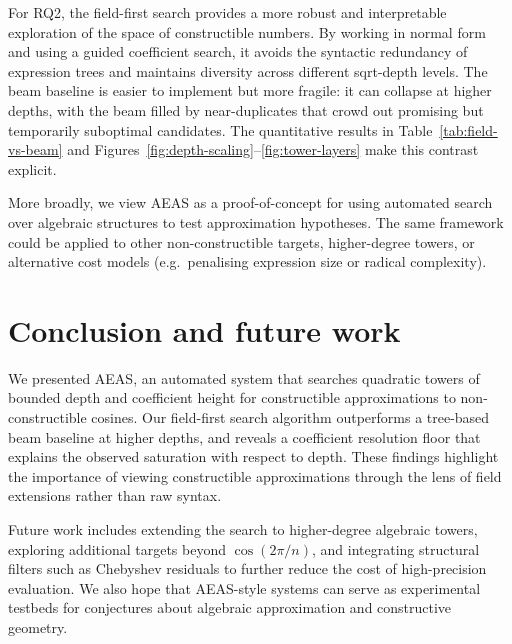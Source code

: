 \documentclass[11pt]{article}
\begin{document}
For RQ2, the field-first search provides a more robust and interpretable exploration of the space of constructible numbers.
By working in normal form and using a guided coefficient search, it avoids the syntactic redundancy of expression trees and maintains diversity across different sqrt-depth levels.
The beam baseline is easier to implement but more fragile: it can collapse at higher depths, with the beam filled by near-duplicates that crowd out promising but temporarily suboptimal candidates.
The quantitative results in Table~\ref{tab:field-vs-beam} and Figures~\ref{fig:depth-scaling}--\ref{fig:tower-layers} make this contrast explicit.

More broadly, we view AEAS as a proof-of-concept for using automated search over algebraic structures to test approximation hypotheses.
The same framework could be applied to other non-constructible targets, higher-degree towers, or alternative cost models (e.g.\ penalising expression size or radical complexity).

\section{Conclusion and future work}

We presented AEAS, an automated system that searches quadratic towers of bounded depth and coefficient height for constructible approximations to non-constructible cosines.
Our field-first search algorithm outperforms a tree-based beam baseline at higher depths, and reveals a coefficient resolution floor that explains the observed saturation with respect to depth.
These findings highlight the importance of viewing constructible approximations through the lens of field extensions rather than raw syntax.

Future work includes extending the search to higher-degree algebraic towers, exploring additional targets beyond $\cos(2\pi/n)$, and integrating structural filters such as Chebyshev residuals to further reduce the cost of high-precision evaluation.
We also hope that AEAS-style systems can serve as experimental testbeds for conjectures about algebraic approximation and constructive geometry.
\end{document}
